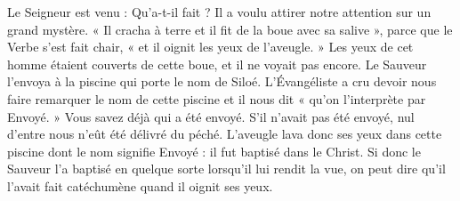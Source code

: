 Le Seigneur est venu : Qu’a-t-il fait ? Il a voulu attirer notre attention sur un grand mystère. « Il cracha à terre et il fit de la boue avec sa salive », parce que le Verbe s’est fait chair, « et il oignit les yeux de l’aveugle. » Les yeux de cet homme étaient couverts de cette boue, et il ne voyait pas encore. Le Sauveur l’envoya à la piscine qui porte le nom de Siloé. L’Évangéliste a cru devoir nous faire remarquer le nom de cette piscine et il nous dit « qu’on l’interprète par Envoyé. » Vous savez déjà qui a été envoyé. S’il n’avait pas été envoyé, nul d’entre nous n’eût été délivré du péché. L’aveugle lava donc ses yeux dans cette piscine dont le nom signifie Envoyé : il fut baptisé dans le Christ. Si donc le Sauveur l’a baptisé en quelque sorte lorsqu’il lui rendit la vue, on peut dire qu’il l’avait fait catéchumène quand il oignit ses yeux.

